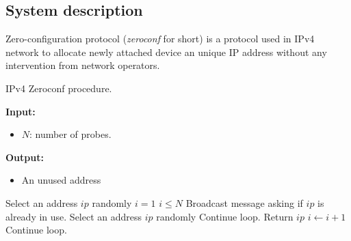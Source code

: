 \subsection{System description}
Zero-configuration protocol (\textit{zeroconf} for short) is a protocol used in IPv4 network to
allocate newly attached device an unique IP address without any intervention from network operators.
\begin{algorithm}[H]
    \caption{IPv4 Zeroconf procedure.}
    \label{alg:gen-sir-ctmc}
    \hspace*{\algorithmicindent} \textbf{Input:}
    \begin{itemize}
        \item $N$: number of probes.
    \end{itemize}
    \hspace*{\algorithmicindent} \textbf{Output:}
    \begin{itemize}
        \item An unused address
    \end{itemize}
    \begin{algorithmic}[1]
        \State Select an address $ip$ randomly
        \State $i = 1$
        \While $i \leq N$
        \State Broadcast message asking if $ip$ is already in use.
        \State Select an address $ip$ randomly
        \State Continue loop.
        \EndIf
        \State Return $ip$
        \EndIf
        \State $i \leftarrow i + 1$
        \State Continue loop.
        \EndIf
        \EndWhile
        \EndProcedure
    \end{algorithmic}
\end{algorithm}

